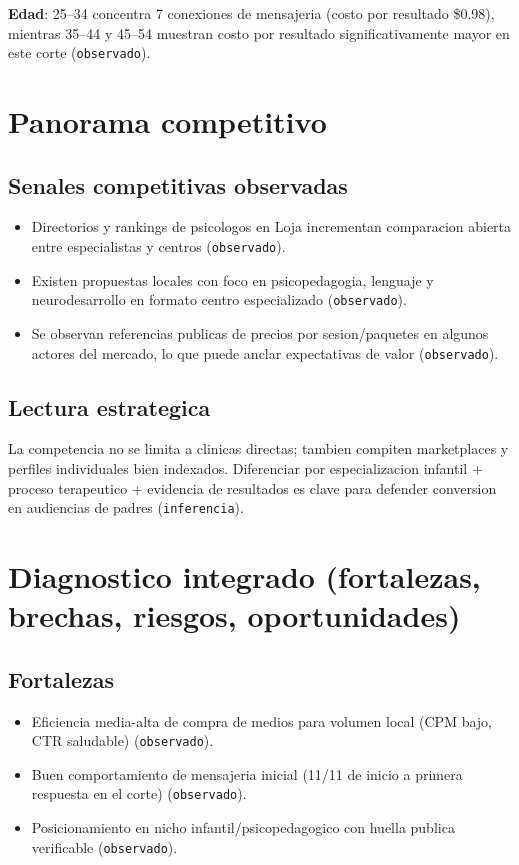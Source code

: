 \documentclass[9pt,a4paper,twocolumn,twoside]{tau-class/tau}
\begin{document}
\textbf{Edad}: 25--34 concentra 7 conexiones de mensajeria (costo por resultado \$0.98), mientras 35--44 y 45--54 muestran costo por resultado significativamente mayor en este corte (\texttt{observado}).

\section{Panorama competitivo}
\subsection{Senales competitivas observadas}
\begin{itemize}
  \item Directorios y rankings de psicologos en Loja incrementan comparacion abierta entre especialistas y centros (\texttt{observado}).
  \item Existen propuestas locales con foco en psicopedagogia, lenguaje y neurodesarrollo en formato centro especializado (\texttt{observado}).
  \item Se observan referencias publicas de precios por sesion/paquetes en algunos actores del mercado, lo que puede anclar expectativas de valor (\texttt{observado}).
\end{itemize}

\subsection{Lectura estrategica}
La competencia no se limita a clinicas directas; tambien compiten marketplaces y perfiles individuales bien indexados. Diferenciar por especializacion infantil + proceso terapeutico + evidencia de resultados es clave para defender conversion en audiencias de padres (\texttt{inferencia}).

\section{Diagnostico integrado (fortalezas, brechas, riesgos, oportunidades)}
\subsection{Fortalezas}
\begin{itemize}
  \item Eficiencia media-alta de compra de medios para volumen local (CPM bajo, CTR saludable) (\texttt{observado}).
  \item Buen comportamiento de mensajeria inicial (11/11 de inicio a primera respuesta en el corte) (\texttt{observado}).
  \item Posicionamiento en nicho infantil/psicopedagogico con huella publica verificable (\texttt{observado}).
\end{itemize}
\end{document}
